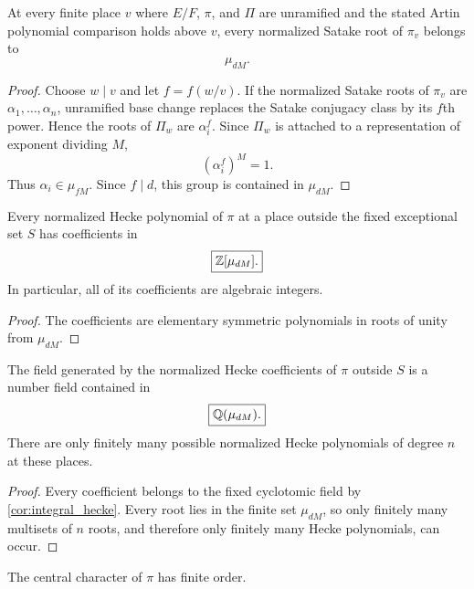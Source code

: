 \begin{theorem}\label{thm:finite_satake_roots}
At every finite place \(v\) where \(E/F\), \(\pi\), and \(\Pi\) are unramified and the stated Artin polynomial comparison holds above \(v\), every normalized Satake root of \(\pi_v\) belongs to
\[
 \boxed{
 \mu_{dM}.
 }
\]
\end{theorem}

\begin{proof}
Choose \(w\mid v\) and let \(f=f(w/v)\). If the normalized Satake roots of \(\pi_v\) are \(\alpha_1,\ldots,\alpha_n\), unramified base change replaces the Satake conjugacy class by its \(f\)th power. Hence the roots of \(\Pi_w\) are \(\alpha_i^f\). Since \(\Pi_w\) is attached to a representation of exponent dividing \(M\),
\[
 (\alpha_i^f)^M=1.
\]
Thus \(\alpha_i\in\mu_{fM}\). Since \(f\mid d\), this group is contained in \(\mu_{dM}\).
\end{proof}

\begin{corollary}\label{cor:integral_hecke}
Every normalized Hecke polynomial of \(\pi\) at a place outside the fixed exceptional set \(S\) has coefficients in
\[
 \boxed{
 \mathbb Z[\mu_{dM}].
 }
\]
In particular, all of its coefficients are algebraic integers.
\end{corollary}

\begin{proof}
The coefficients are elementary symmetric polynomials in roots of unity from \(\mu_{dM}\).
\end{proof}

\begin{corollary}\label{cor:finite_hecke_field}
The field generated by the normalized Hecke coefficients of \(\pi\) outside \(S\) is a number field contained in
\[
 \boxed{
 \mathbb Q(\mu_{dM}).
 }
\]
There are only finitely many possible normalized Hecke polynomials of degree \(n\) at these places.
\end{corollary}

\begin{proof}
Every coefficient belongs to the fixed cyclotomic field by \cref{cor:integral_hecke}. Every root lies in the finite set \(\mu_{dM}\), so only finitely many multisets of \(n\) roots, and therefore only finitely many Hecke polynomials, can occur.
\end{proof}

\begin{corollary}\label{cor:finite_central_char}
The central character of \(\pi\) has finite order.
\end{corollary}

